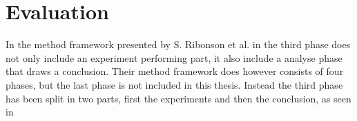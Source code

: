 \section{Evaluation}\label{sec:methodEvaluation}
In the method framework presented by S. Ribonson et al. in \cite{SecretsSuccessfulSimulation1995} the third phase does not only include an experiment performing part, it also include a analyse phase that draws a conclusion.
Their method framework does however consists of four phases, but the last phase is not included in this thesis.
Instead the third phase has been split in two parts, first the experiments and then the conclusion, as seen in 

\bigskip

